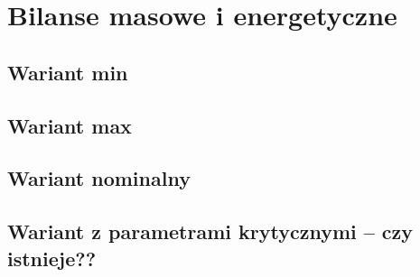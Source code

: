 \section{Bilanse masowe i energetyczne }

\subsection{Wariant min}


\subsection{Wariant max}

\subsection{Wariant nominalny}

\subsection{Wariant z parametrami krytycznymi – czy istnieje??}